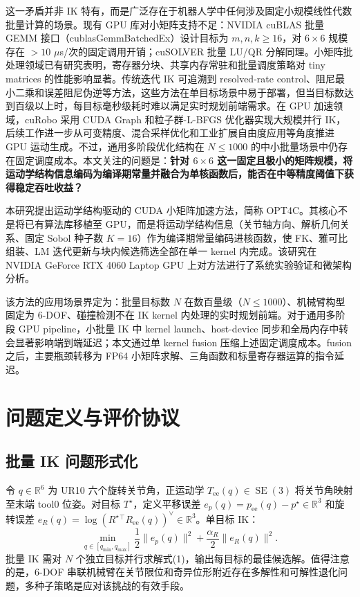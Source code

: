 \documentclass[twocolumn,a4paper,10pt]{ctexart}
\DeclareMathOperator{\SE}{SE}
\newcommand{\R}{\mathbb{R}}
\begin{document}
这一矛盾并非 IK 特有，而是广泛存在于机器人学中任何涉及固定小规模线性代数批量计算的场景。现有 GPU 库对小矩阵支持不足：NVIDIA cuBLAS 批量 GEMM 接口（cublasGemmBatchedEx）设计目标为 $m,n,k\ge16$，对 $6\times6$ 规模存在 $>10$ $\mu$s/次的固定调用开销；cuSOLVER 批量 LU/QR 分解同理\cite{cuda}。小矩阵批处理领域已有研究表明，寄存器分块、共享内存常驻和批量调度策略对 tiny matrices 的性能影响显著\cite{abdelfattah2018tiny}。传统迭代 IK 可追溯到 resolved-rate control、阻尼最小二乘和误差阻尼伪逆等方法\cite{whitney1969resolved,wampler1986dls,chan1988edpi,nakamura1986ik,chiaverini1997singularity}，这些方法在单目标场景中易于部署，但当目标数达到百级以上时，每目标毫秒级耗时难以满足实时规划前端需求。在 GPU 加速领域，cuRobo\cite{curobo} 采用 CUDA Graph 和粒子群-L-BFGS 优化器实现大规模并行 IK，后续工作进一步从可变精度、混合采样优化和工业扩展自由度应用等角度推进 GPU 运动生成\cite{hsiao2023vapr,yasutake2025hjcdik,abuelsamen2025industrial}。不过，通用多阶段优化结构在 $N\le1000$ 的中小批量场景中仍存在固定调度成本。本文关注的问题是：\textbf{针对 $6\times6$ 这一固定且极小的矩阵规模，将运动学结构信息编码为编译期常量并融合为单核函数后，能否在中等精度阈值下获得稳定吞吐收益？}

本研究提出运动学结构驱动的 CUDA 小矩阵加速方法，简称 OPT4C。其核心不是将已有算法库移植至 GPU，而是将运动学结构信息（关节轴方向、解析几何关系、固定 Sobol 种子数 $K=16$）作为编译期常量编码进核函数，使 FK、雅可比组装、LM 迭代更新与块内候选筛选全部在单一 kernel 内完成。该研究在 NVIDIA GeForce RTX 4060 Laptop GPU 上对方法进行了系统实验验证和微架构分析。

该方法的应用场景界定为：批量目标数 $N$ 在数百量级（$N\le1000$）、机械臂构型固定为 6-DOF、碰撞检测不在 IK kernel 内处理的实时规划前端。对于通用多阶段 GPU pipeline，小批量 IK 中 kernel launch、host-device 同步和全局内存中转会显著影响端到端延迟；本文通过单 kernel fusion 压缩上述固定调度成本。fusion 之后，主要瓶颈转移为 FP64 小矩阵求解、三角函数和标量寄存器运算的指令延迟。

\section{问题定义与评价协议}

\subsection{批量 IK 问题形式化}

令 $q\in\R^6$ 为 UR10 六个旋转关节角，正运动学 $T_{\mathrm{ee}}(q)\in\SE(3)$ 将关节角映射至末端 tool0 位姿。对目标 $T^\star$，定义平移误差 $e_p(q)=p_{\mathrm{ee}}(q)-p^\star\in\R^3$ 和旋转误差 $e_R(q)=\log(R^\star{}^\top R_{\mathrm{ee}}(q))^\vee\in\R^3$。单目标 IK：
\begin{equation}
\min_{q\in[q_{\min},q_{\max}]}\frac{1}{2}\|e_p(q)\|^2+\frac{\alpha_R}{2}\|e_R(q)\|^2.
\end{equation}
批量 IK 需对 $N$ 个独立目标并行求解式(1)，输出每目标的最佳候选解。值得注意的是，6-DOF 串联机械臂在关节限位和奇异位形附近存在多解性和可解性退化问题\cite{nakamura1986ik}，多种子策略是应对该挑战的有效手段。
\end{document}
